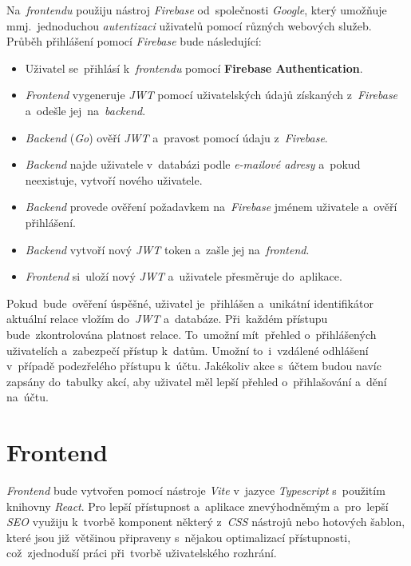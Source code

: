 \documentclass[11pt,a4paper]{report}
\begin{document}
            Na~\emph{frontendu} použiju nástroj \emph{Firebase} od~společnosti \emph{Google}, který umožňuje mmj.~jednoduchou \emph{autentizaci} uživatelů pomocí různých webových služeb. Průběh přihlášení pomocí \emph{Firebase} bude následující:
            \begin{itemize}
                \item Uživatel se~přihlásí k~\emph{frontendu} pomocí \textbf{Firebase Authentication}.
                \item \emph{Frontend} vygeneruje \emph{JWT} pomocí uživatelských údajů získaných z~\emph{Firebase} a~odešle jej~na~\emph{backend}.
                \item \emph{Backend} (\emph{Go}) ověří \emph{JWT} a~pravost pomocí údaju z~\emph{Firebase}.
                \item \emph{Backend} najde uživatele v~databázi podle \emph{e-mailové adresy} a~pokud neexistuje, vytvoří nového uživatele.
                \item \emph{Backend} provede ověření požadavkem na~\emph{Firebase} jménem uživatele a~ověří přihlášení.
                \item \emph{Backend} vytvoří nový \emph{JWT} token a~zašle jej na~\emph{frontend}.
                \item \emph{Frontend} si~uloží nový \emph{JWT} a~uživatele přesměruje do~aplikace.
            \end{itemize}
            
            Pokud~bude~ověření úspěšné, uživatel je~přihlášen a~unikátní identifikátor aktuální relace vložím do~\emph{JWT} a~databáze. Při~každém přístupu bude~zkontrolována platnost relace. To~umožní mít~přehled o~přihlášených uživatelích a~zabezpečí přístup k~datům. Umožní to~i~vzdálené odhlášení v~případě podezřelého přístupu k~účtu. Jakékoliv akce s~účtem budou navíc zapsány do~tabulky akcí, aby uživatel měl lepší přehled o~přihlašování a~dění na~účtu.

        \section{Frontend}
            \emph{Frontend} bude vytvořen pomocí nástroje \emph{Vite} v~jazyce \emph{Typescript} s~použitím knihovny \emph{React}. Pro lepší přístupnost a~aplikace znevýhodněmým a~pro~lepší \emph{SEO} využiju k~tvorbě komponent některý z~\emph{CSS} nástrojů nebo hotových šablon, které jsou již~většinou připraveny s~nějakou optimalizací přístupnosti, což~zjednoduší práci při~tvorbě uživatelského rozhrání.
\end{document}
